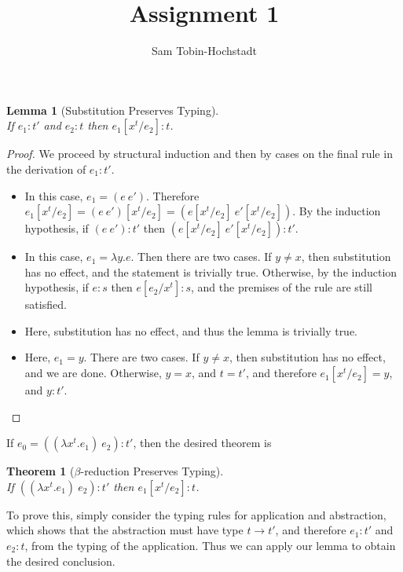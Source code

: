 \documentclass{article}
\newtheorem{theorem}{Theorem}
\newtheorem{lemma}{Lemma}
\newcommand{\proofcase}[1]{\item[Case {\textsc {#1}}:]}
\begin{document}
\title{Assignment 1}
\author{Sam Tobin-Hochstadt}

\maketitle

\begin{lemma}[Substitution Preserves Typing]\mbox{}\\
If $e_1 : t'$ and $e_2 : t$ then $e_1[x^t/e_2]:t$.
\end{lemma}

\begin{proof}
  We proceed by structural induction and then by cases on the final
  rule in the derivation of $e_1 : t'$.

\begin{itemize}
  \proofcase{T-App} In this case, $e_1 = (e\ e')$.  Therefore
  $e_1[x^t/e_2] = (e\ e')[x^t/e_2] = (e[x^t/e_2]\ e'[x^t/e_2])$.  By the
  induction hypothesis, if $(e\ e') : t'$ then $(e[x^t/e_2]\
  e'[x^t/e_2]) : t'$.
  \proofcase{T-Abs} In this case, $e_1 = \lambda y.e$.  Then there are
  two cases.  If $y \neq x$, then substitution has no effect, and the
  statement is trivially true.  Otherwise, by the induction
  hypothesis, if $e : s$ then $e[e_2/x^t] : s$, and the premises of
  the rule are still satisfied.
  \proofcase{T-Const}  Here, substitution has no effect, and thus the
  lemma is trivially true.  
  \proofcase{T-Var}  Here, $e_1 = y$.  There are two cases.  If $y
  \neq x$, then substitution has no effect, and we are done.
  Otherwise, $y = x$, and $t = t'$, and therefore $e_1[x^t/e_2] = y$,
  and $y : t'$.  
\end{itemize}

\end{proof}

If $e_0 = ((\lambda x^t.e_1)\ e_2) : t'$, then the desired theorem is

\begin{theorem}[$\beta$-reduction Preserves Typing] \mbox{}\\
If $((\lambda x^t.e_1)\ e_2) : t'$ then $e_1[x^t/e_2]:t$.
\end{theorem}

To prove this, simply consider the typing rules for application and abstraction, which
shows that the abstraction must have type $t \rightarrow t'$, and therefore
$e_1 : t'$ and $e_2 : t$, from the typing of the application.  Thus we
can apply our lemma to obtain the desired conclusion.
\end{document}
